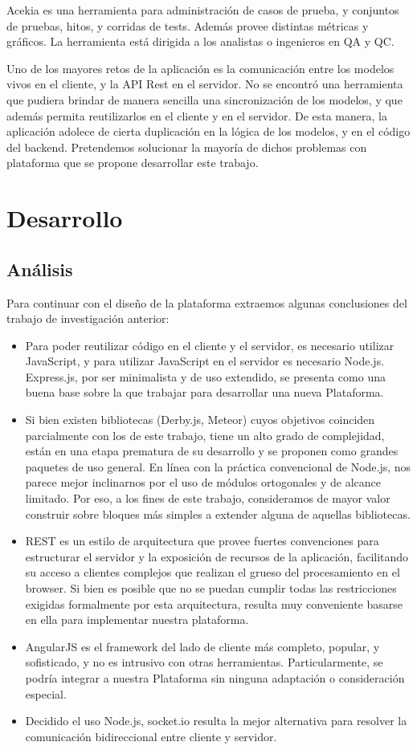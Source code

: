 \documentclass[doc,helv,longtable]{article}
\begin{document}
Acekia es una herramienta para administración de casos de prueba, y conjuntos de pruebas, hitos, y corridas de tests. Además provee distintas métricas y gráficos. La herramienta está dirigida a los analistas o ingenieros en QA y QC.

Uno de los mayores retos de la aplicación es la comunicación entre los modelos vivos en el cliente, y la API Rest en el servidor. No se encontró una herramienta que pudiera brindar de manera sencilla una sincronización de los modelos, y que además permita reutilizarlos en el cliente y en el servidor. De esta manera, la aplicación adolece de cierta duplicación en la lógica de los modelos, y en el código del backend. Pretendemos solucionar la mayoría de dichos problemas con plataforma que se propone desarrollar este trabajo. 

\section{Desarrollo}
\subsection{Análisis}
Para continuar con el diseño de la plataforma extraemos algunas conclusiones del trabajo de investigación anterior:
\begin{itemize}
\item  Para poder reutilizar código en el cliente y el servidor, es necesario utilizar JavaScript, y para utilizar JavaScript en el servidor es necesario Node.js. Express.js, por ser minimalista y de uso extendido, se presenta como una buena base sobre la que trabajar para desarrollar una nueva Plataforma.
\item  Si bien existen bibliotecas (Derby.js, Meteor) cuyos objetivos coinciden parcialmente con los de este trabajo, tiene un alto grado de complejidad, están en una etapa prematura de su desarrollo y se proponen como grandes paquetes de uso general. En línea con la práctica convencional de Node.js, nos parece mejor inclinarnos por el uso de módulos ortogonales y de alcance limitado. Por eso, a los fines de este trabajo, consideramos de mayor valor construir sobre bloques más simples a extender alguna de aquellas bibliotecas.
\item  REST es un estilo de arquitectura que provee fuertes convenciones para estructurar el servidor y la exposición de recursos de la aplicación, facilitando su acceso a clientes complejos que realizan el grueso del procesamiento en el browser. Si bien es posible que no se puedan cumplir todas las restricciones exigidas formalmente por esta arquitectura, resulta muy conveniente basarse en ella para implementar nuestra plataforma.
\item  AngularJS es el framework del lado de cliente más completo, popular, y sofisticado, y no es intrusivo con otras herramientas. Particularmente, se podría integrar a nuestra Plataforma sin ninguna adaptación o consideración especial.
\item  Decidido el uso Node.js, socket.io resulta la mejor alternativa para resolver la comunicación bidireccional entre cliente y servidor.

\end{itemize}
\end{document}
